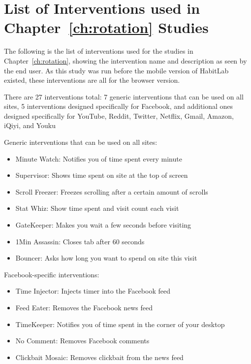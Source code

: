 
\chapter{List of Interventions used in Chapter~\ref{ch:rotation} Studies}

The following is the list of interventions used for the studies in Chapter~\ref{ch:rotation}, showing the intervention name and description as seen by the end user. As this study was run before the mobile version of HabitLab existed, these interventions are all for the browser version.

There are 27 interventions total: 7 generic interventions that can be used on all sites, 5 interventions designed specifically for Facebook, and additional ones designed specifically for YouTube, Reddit, Twitter, Netflix, Gmail, Amazon, iQiyi, and Youku

Generic interventions that can be used on all sites:

\begin{itemize}
    \item Minute Watch: Notifies you of time spent every minute
    \item Supervisor: Shows time spent on site at the top of screen
    \item Scroll Freezer: Freezes scrolling after a certain amount of scrolls
    \item Stat Whiz: Show time spent and visit count each visit
    \item GateKeeper: Makes you wait a few seconds before visiting
    \item 1Min Assassin: Closes tab after 60 seconds
    \item Bouncer: Asks how long you want to spend on site this visit
\end{itemize}

\vspace{2mm}

Facebook-specific interventions:

\begin{itemize}
    \item Time Injector: Injects timer into the Facebook feed
    \item Feed Eater: Removes the Facebook news feed
    \item TimeKeeper: Notifies you of time spent in the corner of your desktop
    \item No Comment: Removes Facebook comments
    \item Clickbait Mosaic: Removes clickbait from the news feed
\end{itemize}

